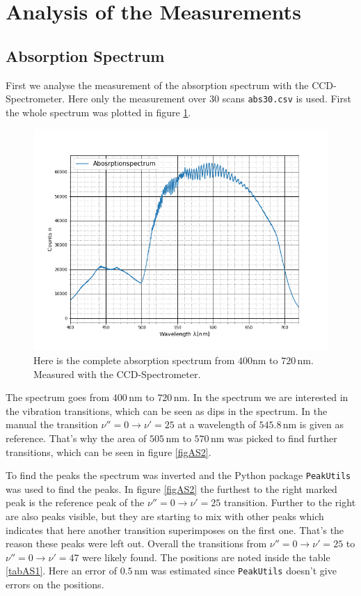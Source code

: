 \section{Analysis of the Measurements}
\subsection{Absorption Spectrum}
First we analyse the measurement of the absorption spectrum with the CCD-Spectrometer. Here only the measurement over $30$ scans \verb|abs30.csv| is used. First the whole spectrum was plotted in figure \ref{figAS1}.
\begin{figure}[ht]
	\includegraphics[scale=0.5]{Bild/AS_1.png}
	\centering
	\caption[Complete Absorption Spectrum]{\small Here is the complete absorption spectrum from $400$nm to $720$\,nm. Measured with the CCD-Spectrometer.}
	\label{figAS1}
\end{figure}
The spectrum goes from $400\,$nm to $720$\,nm. In the spectrum we are interested in the vibration transitions, which can be seen as dips in the spectrum. In the manual\cite{?} the transition $\nu''=0\rightarrow \nu'=25$ at a wavelength of $545.8\,$nm is given as reference. That's why the area of $505\,$nm to $570\,$nm was picked to find further transitions, which can be seen in figure \ref{figAS2}.\par
To find the peaks the spectrum was inverted and the Python package \verb|PeakUtils| was used to find the peaks. In figure \ref{figAS2} the furthest to the right marked peak is the reference peak of the $\nu''=0\rightarrow \nu'=25$ transition. Further to the right are also peaks visible, but they are starting to mix with other peaks which indicates that here another transition superimposes on the first one. That's the reason these peaks were left out. Overall the transitions from $\nu''=0\rightarrow \nu'=25$ to $\nu''=0\rightarrow \nu'=47$ were likely found. The positions are noted inside the table \ref{tabAS1}. Here an error of $0.5\,$nm was estimated since \verb|PeakUtils|\cite{Peak} doesn't give errors on the positions. \par
